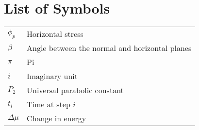 \chapter*{List of Symbols} \label{symbols}

\hspace*{-0.6in}
\begin{tabular}{@{}C{1in} L{5in}}
    $\phi_p$    & Horizontal stress \\
    $\beta$     & Angle between the normal and horizontal planes \\
    $\pi$       & Pi \\
    $i$         & Imaginary unit \\
    $P_2$       & Universal parabolic constant \\
    $t_i$       & Time at step $i$ \\
    $\Delta\mu$ & Change in energy \\
\end{tabular}
